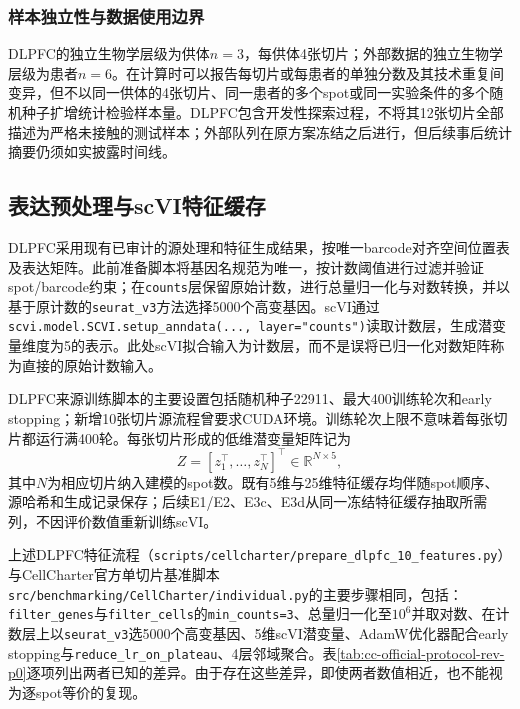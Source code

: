 \subsubsection{样本独立性与数据使用边界}
DLPFC的独立生物学层级为供体$n=3$，每供体4张切片；外部数据的独立生物学层级为患者$n=6$。在计算时可以报告每切片或每患者的单独分数及其技术重复间变异，但不以同一供体的4张切片、同一患者的多个spot或同一实验条件的多个随机种子扩增统计检验样本量。DLPFC包含开发性探索过程，不将其12张切片全部描述为严格未接触的测试样本；外部队列在原方案冻结之后进行，但后续事后统计摘要仍须如实披露时间线。

\subsection{表达预处理与scVI特征缓存}
\label{subsec:cc-preprocess-v1}
DLPFC采用现有已审计的源处理和特征生成结果，按唯一barcode对齐空间位置表及表达矩阵。此前准备脚本将基因名规范为唯一，按计数阈值进行过滤并验证spot/barcode约束；在\texttt{counts}层保留原始计数，进行总量归一化与对数转换，并以基于原计数的\texttt{seurat\_v3}方法选择5000个高变基因。scVI通过\texttt{scvi.model.SCVI.setup\_anndata(..., layer="counts")}读取计数层，生成潜变量维度为5的表示。此处scVI拟合输入为计数层，而不是误将已归一化对数矩阵称为直接的原始计数输入。

DLPFC来源训练脚本的主要设置包括随机种子22911、最大400训练轮次和early stopping；新增10张切片源流程曾要求CUDA环境。训练轮次上限不意味着每张切片都运行满400轮。每张切片形成的低维潜变量矩阵记为
\begin{equation}
Z=[z_1^\top,\ldots,z_N^\top]^\top\in\mathbb{R}^{N\times5},
\end{equation}
其中$N$为相应切片纳入建模的spot数。既有5维与25维特征缓存均伴随spot顺序、源哈希和生成记录保存；后续E1/E2、E3c、E3d从同一冻结特征缓存抽取所需列，不因评价数值重新训练scVI。

上述DLPFC特征流程（\texttt{scripts/cellcharter/prepare\_dlpfc\_10\_features.py}）与CellCharter官方单切片基准脚本\texttt{src/benchmarking/CellCharter/individual.py}\cite{cellcharteranalyses2024}的主要步骤相同，包括：\texttt{filter\_genes}与\texttt{filter\_cells}的\texttt{min\_counts=3}、总量归一化至$10^6$并取对数、在计数层上以\texttt{seurat\_v3}选5000个高变基因、5维scVI潜变量、AdamW优化器配合early stopping与\texttt{reduce\_lr\_on\_plateau}、4层邻域聚合。表\ref{tab:cc-official-protocol-rev-p0}逐项列出两者已知的差异。由于存在这些差异，即使两者数值相近，也不能视为逐spot等价的复现。

